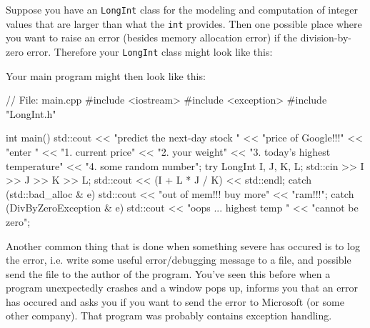 \begin{ex}

\newpage{}

Suppose you have an \texttt{LongInt} class for the modeling and
computation of integer values that are larger than what the \texttt{int}
provides. Then one possible place where you want to raise an error
(besides memory allocation error) if the division-by-zero error.
Therefore your \texttt{LongInt} class might look like this:


Your main program might then look like this:

\begin{console}
// File: main.cpp
#include <iostream>
#include <exception>
#include "LongInt.h"

int main()
{   
    std::cout << "predict the next-day stock "
    << "price of Google!!!\n"
    << "enter \n"
    << "1. current price\n"
    << "2. your weight\n"
    << "3. today's highest temperature\n"
    << "4. some random number\n";
    try
    {
        LongInt I, J, K, L;
        std::cin >> I >> J >> K >> L;
        std::cout << (I + L * J / K) << std::endl;
    }
    catch (std::bad_alloc & e)
    {
        std::cout << "out of mem!!! buy more"
                  << "ram!!!\n";
    }
    catch (DivByZeroException & e)
    {
        std::cout << "oops ... highest temp "
        << "cannot be zero\n";
    }
}
\end{console}

Another common thing that is done when something severe has occured is
to log the error, i.e. write some useful error/debugging message to a
file, and possible send the file to the author of the program.
You've seen this before when a program unexpectedly
crashes and a window pops up, informs you that an error has occured and
asks you if you want to send the error to Microsoft (or some other
company). That program was probably contains exception handling.


\end{ex}
